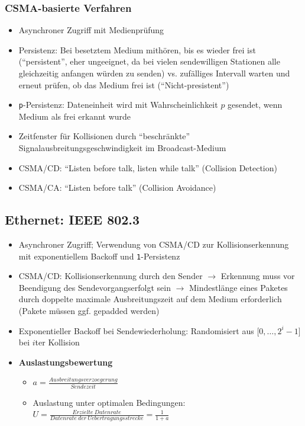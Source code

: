\subsubsection{CSMA-basierte Verfahren}
\begin{itemize}
	\item Asynchroner Zugriff mit Medienprüfung
	\item Persistenz: Bei besetztem Medium mithören, bis es wieder frei ist ("`persistent"', eher ungeeignet, da bei vielen sendewilligen Stationen alle gleichzeitig anfangen würden zu senden) vs. zufälliges Intervall warten und erneut prüfen, ob das Medium frei ist ("`Nicht-presistent"')
	\item \texttt{p}-Persistenz: Dateneinheit wird mit Wahrscheinlichkeit \(p\) gesendet, wenn Medium als frei erkannt wurde
	\item Zeitfenster für Kollisionen durch "`beschränkte"' Signalausbreitungsgeschwindigkeit im Broadcast-Medium
	\item CSMA/CD: "`Listen before talk, listen while talk"' (Collision Detection)
	\item CSMA/CA: "`Listen before talk"' (Collision Avoidance)
\end{itemize}


\subsection{Ethernet: IEEE 802.3}
\begin{itemize}
	\item Asynchroner Zugriff; Verwendung von CSMA/CD zur Kollisionserkennung mit exponentiellem Backoff und \texttt{1}-Persistenz
	\item CSMA/CD: Kollisionserkennung durch den Sender \(\rightarrow\) Erkennung muss vor Beendigung des Sendevorgangserfolgt sein \(\rightarrow\) Mindestlänge eines Paketes durch doppelte maximale Ausbreitungszeit auf dem Medium erforderlich (Pakete müssen ggf. gepadded werden)
	\item Exponentieller Backoff bei Sendewiederholung: Randomisiert aus \(\big\lbrack0,\dots,2^i-1\big\rbrack\) bei \(i\)ter Kollision
	\item \textbf{Auslastungsbewertung}
	\begin{itemize}
		\item \(a=\frac{Ausbreitungsverzoegerung}{Sendezeit}\)
		\item Auslastung unter optimalen Bedingungen: \(U=\frac{Erzielte~Datenrate}{Datenrate~der~Uebertragungsstrecke}=\frac{1}{1+a}\)
	\end{itemize}
\end{itemize}

